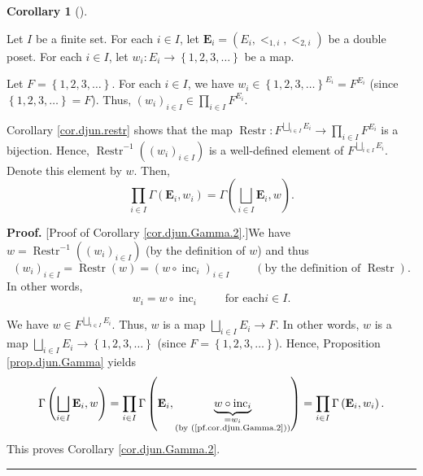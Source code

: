 \documentclass[numbers=enddot,12pt,final,onecolumn,notitlepage,abstracton]{scrartcl}
\theoremstyle{definition}
\newtheorem{coro}[theo]{Corollary}
\newenvironment{corollary}[1][]
{\begin{coro}[#1]\begin{leftbar}}
{\end{leftbar}\end{coro}}
\newenvironment{proof}[1][Proof]{\noindent\textbf{#1.} }{\ \rule{0.5em}{0.5em}}
\let\prodnonlimits\prod
\renewcommand{\prod}{\prodnonlimits\limits}
\newenvironment{verlong}{}{}
\begin{document}
\begin{verlong}
\begin{footnotesize}
\begin{corollary}
\label{cor.djun.Gamma.2}Let $I$ be a finite set. For each $i\in I$, let
$\mathbf{E}_{i}=\left(  E_{i},<_{1,i},<_{2,i}\right)  $ be a double poset. For
each $i\in I$, let $w_{i}:E_{i}\rightarrow\left\{  1,2,3,\ldots\right\}  $ be
a map.

Let $F=\left\{  1,2,3,\ldots\right\}  $. For each $i\in I$, we have $w_{i}%
\in\left\{  1,2,3,\ldots\right\}  ^{E_{i}}=F^{E_{i}}$ (since $\left\{
1,2,3,\ldots\right\}  =F$). Thus, $\left(  w_{i}\right)  _{i\in I}\in
\prod_{i\in I}F^{E_{i}}$.

Corollary \ref{cor.djun.restr} shows that the map $\operatorname*{Restr}%
:F^{\bigsqcup_{i\in I}E_{i}}\rightarrow\prod_{i\in I}F^{E_{i}}$ is a
bijection. Hence, $\operatorname*{Restr}\nolimits^{-1}\left(  \left(
w_{i}\right)  _{i\in I}\right)  $ is a well-defined element of $F^{\bigsqcup
_{i\in I}E_{i}}$. Denote this element by $w$. Then,%
\[
\prod_{i\in I}\Gamma\left(  \mathbf{E}_{i},w_{i}\right)  =\Gamma\left(
\bigsqcup_{i\in I}\mathbf{E}_{i},w\right)  .
\]

\end{corollary}

\begin{proof}
[Proof of Corollary \ref{cor.djun.Gamma.2}.]We have $w=\operatorname*{Restr}%
\nolimits^{-1}\left(  \left(  w_{i}\right)  _{i\in I}\right)  $ (by the
definition of $w$) and thus%
\[
\left(  w_{i}\right)  _{i\in I}=\operatorname*{Restr}\left(  w\right)
=\left(  w\circ\operatorname*{inc}\nolimits_{i}\right)  _{i\in I}%
\ \ \ \ \ \ \ \ \ \ \left(  \text{by the definition of }\operatorname*{Restr}%
\right)  .
\]
In other words,%
\begin{equation}
w_{i}=w\circ\operatorname*{inc}\nolimits_{i}\ \ \ \ \ \ \ \ \ \ \text{for each
}i\in I. \label{pf.cor.djun.Gamma.2}%
\end{equation}


We have $w\in F^{\bigsqcup_{i\in I}E_{i}}$. Thus, $w$ is a map $\bigsqcup
_{i\in I}E_{i}\rightarrow F$. In other words, $w$ is a map $\bigsqcup_{i\in
I}E_{i}\rightarrow\left\{  1,2,3,\ldots\right\}  $ (since $F=\left\{
1,2,3,\ldots\right\}  $). Hence, Proposition \ref{prop.djun.Gamma} yields%
\[
\Gamma\left(  \bigsqcup_{i\in I}\mathbf{E}_{i},w\right)  =\prod_{i\in I}%
\Gamma\left(  \mathbf{E}_{i},\underbrace{w\circ\operatorname*{inc}%
\nolimits_{i}}_{\substack{=w_{i}\\\text{(by (\ref{pf.cor.djun.Gamma.2}))}%
}}\right)  =\prod_{i\in I}\Gamma\left(  \mathbf{E}_{i},w_{i}\right)  .
\]
This proves Corollary \ref{cor.djun.Gamma.2}.
\end{proof}


\end{footnotesize}
\end{verlong}
\end{document}
